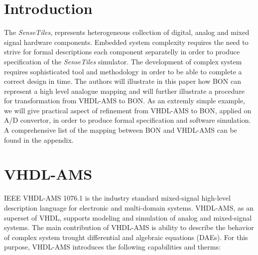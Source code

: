 \documentclass{article}
\newcommand{\STs}{\emph{SenseTiles}\xspace}
\begin{document}
\section{Introduction}
The \STs, represents heterogeneous collection of digital, analog 
and mixed signal hardware components. Embedded system complexity 
requires the need to strive for formal descriptions each component 
separatelly in order to produce specification of the \STs simulator. 
The development of complex system requires sophisticated tool and methodology 
in order to be able to complete a correct design in time.  
The authors will illustrate in this paper how BON can represent a high 
level analogue mapping and will further illustrate a procedure for 
transformation from VHDL-AMS to BON. As an extremly simple example, 
we will give practical aspect of refinement from VHDL-AMS to BON,
applied on A/D convertor, in order to produce formal specification 
and software simulation. A comprehensive list of the mapping between BON 
and VHDL-AMS can be found in the appendix.


\section{VHDL-AMS}
IEEE VHDL-AMS 1076.1 is the industry standard mixed-signal 
high-level description language for electronic and multi-domain 
systems. VHDL-AMS, as an superset of VHDL, supports modeling and 
simulation of analog and mixed-signal systems. The main contribution 
of VHDL-AMS is ability to describe the behavior of complex system 
trought differential and algebraic equations (DAEs). For this purpose, 
VHDL-AMS introduces the following capabilities and therms:
\end{document}
